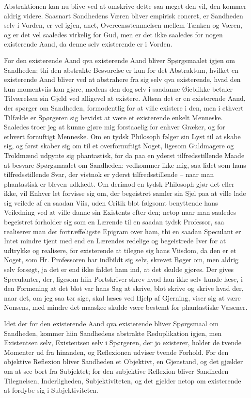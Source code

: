 \documentclass[12pt,a4paper]{article}
\begin{document}
Abstraktionen kan nu blive ved at omskrive dette saa meget den vil, den kommer aldrig videre. Saasnart Sandhedens Væren bliver empirisk concret, er Sandheden selv i Vorden, er vel igjen, anet, Overeensstemmelsen mellem Tænken og Væren, og er det vel saaledes virkelig for Gud, men er det ikke saaledes for nogen existerende Aand, da denne selv existerende er i Vorden.

For den existerende Aand qva existerende Aand bliver Spørgsmaalet igjen om Sandheden; thi den abstrakte Besvarelse er kun for det Abstraktum, hvilket en existerende Aand bliver ved at abstrahere fra sig selv qva existerende, hvad den kun momentviis kan gjøre, medens den dog selv i saadanne Øieblikke betaler Tilværelsen sin Gjeld ved alligevel at existere. Altsaa det er en existerende Aand, der spørger om Sandheden, formodentlig for at ville existere i den, men i ethvert Tilfælde er Spørgeren sig bevidst at være et existerende enkelt Menneske. Saaledes troer jeg at kunne gjøre mig forstaaelig for enhver Græker, og for ethvert fornuftigt Menneske. Om en tydsk Philosoph følger sin Lyst til at skabe sig, og først skaber sig om til et overfornuftigt Noget, ligesom Guldmagere og Troldmænd udpynte sig phantastisk, for da paa en yderst tilfredsstillende Maade at besvare Spørgsmaalet om Sandheden: vedkommer ikke mig, saa lidet som hans tilfredsstillende Svar, der vistnok er yderst tilfredsstillende – naar man phantastisk er bleven udklædt. Om derimod en tydsk Philosoph gjør det eller ikke, vil Enhver let forvisse sig om, der begeistret samler sin Sjel paa at ville lade sig veilede af en saadan Viis, uden Critik blot følgsomt benyttende hans Veiledning ved at ville danne sin Existents efter den; netop naar man saaledes begeistret forholder sig som en Lærende til en saadan tydsk Professor, saa realiserer man det fortræffeligste Epigram over ham, thi en saadan Speculant er Intet mindre tjent med end en Lærendes redelige og begeistrede Iver for at udtrykke og realisere, for existerende at tilegne sig hans Viisdom, da den er et Noget, som Hr. Professoren har indbildt sig selv, skrevet Bøger om, men aldrig selv forsøgt, ja det er end ikke faldet ham ind, at det skulde gjøres. Der gives Speculanter, der, ligesom hiin Portskriver skrev hvad han ikke selv kunde læse, i den Formening at det blot var hans Sag at skrive, blot skrive og skrive hvad der, naar det, om jeg saa tør sige, skal læses ved Hjelp af Gjerning, viser sig at være Nonsens, med mindre det maaskee skulde være bestemt for phantastiske Væsener.

Idet der for den existerende Aand qva existerende bliver Spørgsmaal om Sandheden, kommer hiin Sandhedens abstrakte Reduplikation igjen, men Existentsen selv, Existentsen selv i Spørgeren, der jo existerer, holder de tvende Momenter ud fra hinanden, og Reflexionen udviser tvende Forhold. For den objektive Reflexion bliver Sandheden et Objektivt, en Gjenstand, og det gjælder om at see bort fra Subjektet; for den subjektive Reflexion bliver Sandheden Tilegnelsen, Inderligheden, Subjektiviteten, og det gjelder netop om existerende at fordybe sig i Subjektiviteten.
\end{document}
